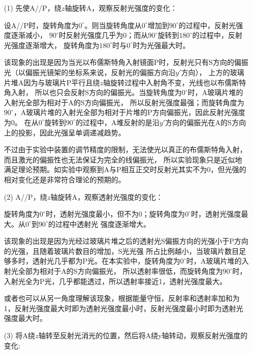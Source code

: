 \documentclass{article}
\newcommand{\degree}{^\circ}
\begin{document}
    \begin{enumerate}
        \item [(1)]
        先使A//P，绕$z$轴旋转A，观察反射光强度的变化：
        
        设A//P时，旋转角度为$0\degree$。则当旋转角度从$0\degree$增加到$90\degree$的过程中，反射光强度逐渐减小，
        $90\degree$时反射光强度几乎为0；而从$90\degree$旋转到$180\degree$的过程中，反射光强度逐渐增大，
        旋转角度为$180\degree$时与$0\degree$时为光强最大时。

        该现象的出现是因为当光以布儒斯特角入射镜面P时，反射光只有S方向的偏振光（以偏振光镜架的坐标系来说，反射光的偏振方向沿$y'$方向），
        上方的玻璃片堆A因为与玻璃片P平行且绕$z$轴旋转过程中入射角不变，光线也以布儒斯特角入射，
        所以也只会反射S方向的偏振光。当旋转角度为$0\degree$时，A玻璃片堆的入射光全部为相对于A的S方向偏振光，
        所以反射光强度最强；而旋转角度为$90\degree$，A玻璃片堆的入射光全部为相对于片堆的P方向偏振光，因此反射光强度为0。
        在从$0\degree$旋转到$90\degree$的过程中，A堆反射的是沿$y'$方向的偏振光在A的S方向上的投影，因此光强呈单调递减趋势。

        不过由于实验中装置的调节精度的限制，无法使光以真正的布儒斯特角入射，而且激光的偏振性也无法保证为完全的线偏振光，
        所以实验现象只是近似地满足理论预期。如实验中观察到A与P相互正交时反射光其实不为0，但光强的相对变化还是非常符合理论的预期的。

        \item [(2)]
        A//P，绕$z$轴旋转A，观察透射光强度的变化：

        旋转角度为$0\degree$时，透射光强度最小，但不为0；旋转角度为$0\degree$时，透射光强度最大。从$0\degree$到$90\degree$的过程中透射光
        强度逐渐增大。

        该现象的出现是因为光经过玻璃片堆之后的透射光S偏振方向的光强小于P方向的光强，且随着玻璃片数目的增加，S光光强
        所占比例越小，当玻璃片数目足够多时，透射光几乎都为P光。在本实验中，旋转角度为$0\degree$时，A玻璃片堆的入射光全部为相对于A的S方向偏振光，
        所以透射率很低，而旋转角度为$90\degree$时，入射光全为P光，几乎都能透过，所以透射率接近1，透射光强度最大。

        或者也可以从另一角度理解该现象，根据能量守恒，反射率和透射率加和为1，反射光强度最大时即为透射光强度最小时，反射光强度最小时即为透射光强度最大时。

        \item [(3)]
        将A绕$z$轴转至反射光消光的位置，然后将A绕y轴转动，观察反射光强度的变化:


\end{enumerate}
\end{document}
